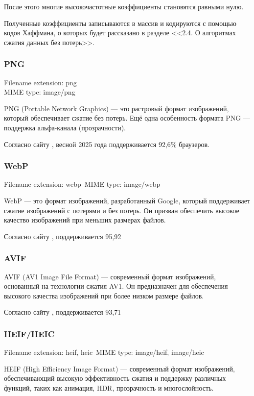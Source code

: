 \documentclass[12pt]{article}
\begin{document}
После этого многие высокочастотные коэффициенты становятся равными нулю.

Полученные коэффициенты записываются в массив и кодируются с помощью кодов Хаффмана,
о которых будет рассказано в разделе <<2.4. О алгоритмах сжатия данных без потерь>>.

\subsubsection{PNG}

Filename extension: png\\
MIME type: image/png

PNG (Portable Network Graphics) — это растровый формат изображений, который обеспечивает сжатие
без потерь. Ещё одна особенность формата PNG — поддержка альфа-канала (прозрачности).

Согласно сайту \cite{caniuse}, весной 2025 года поддерживается 92{,}6\% браузеров.

\subsubsection{WebP}
Filename extension: webp\
MIME type: image/webp

WebP — это формат изображений, разработанный Google, который поддерживает сжатие изображений
с потерями и без потерь. Он призван обеспечить высокое качество изображений при меньших размерах файлов.\

Согласно сайту \cite{caniuse}, поддерживается 95,92%

\subsubsection{AVIF}

AVIF (AV1 Image File Format) — современный формат изображений,
основанный на технологии сжатия AV1. Он предназначен для обеспечения высокого
качества изображений при более низком размере файлов.

Согласно сайту \cite{caniuse}, поддерживается 93,71%

\subsubsection{HEIF/HEIC}
Filename extension: heif, heic\
MIME type: image/heif, image/heic\

HEIF (High Efficiency Image Format) — современный формат изображений,
обеспечивающий высокую эффективность сжатия и поддержку различных функций,
таких как анимация, HDR, прозрачность и многослойность.
\end{document}
